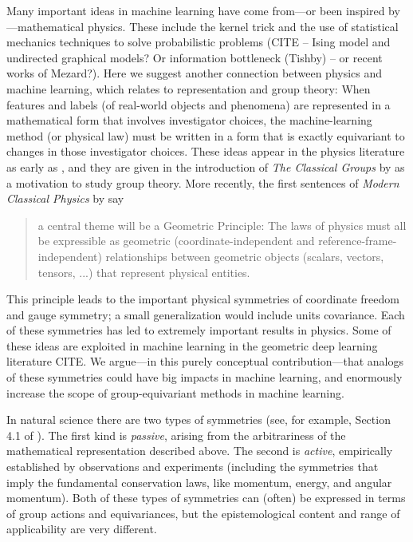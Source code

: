 \documentclass{article}
\theoremstyle{plain}
\theoremstyle{definition}
\theoremstyle{remark}
\begin{document}
Many important ideas in machine learning have come from---or been inspired by---mathematical physics.
These include the kernel trick \cite{CouHil53,SchSmo02} and the use of statistical mechanics techniques to solve probabilistic problems (CITE --  Ising model and undirected graphical models? Or information bottleneck (Tishby) -- or recent works of Mezard?).
Here we suggest another connection between physics and machine learning, which relates to representation and group theory:
When features and labels (of real-world objects and phenomena) are represented in a mathematical form that involves investigator choices, the machine-learning method (or physical law) must be written in a form that is exactly equivariant to changes in those investigator choices.
These ideas appear in the physics literature as early as \citet{gr}, and they are given in the introduction of \textit{The Classical Groups} by \citet{weyl} as a motivation to study group theory.
More recently, the first sentences of \textit{Modern Classical Physics} by \citet{mcp} say  
\begin{quote}
a central theme will be a Geometric Principle: 
The laws of physics must all
be expressible as geometric (coordinate-independent and reference-frame-independent)
relationships between geometric objects (scalars, vectors, tensors, ...) that represent
physical entities.
\end{quote}
This principle leads to the important physical symmetries of coordinate freedom and gauge symmetry; a small generalization would include units covariance.
Each of these symmetries has led to extremely important results in physics. Some of these ideas are exploited in machine learning in the geometric deep learning literature CITE. 
We argue---in this purely conceptual contribution---that analogs of these symmetries could have big impacts in machine learning, and enormously increase the scope of group-equivariant methods in machine learning.

In natural science there are two types of symmetries (see, for example, Section 4.1 of \citealt{rovelli2000loop}). 
The first kind is \emph{passive}, arising from the arbitrariness of the mathematical representation described above.
The second is \emph{active}, empirically established by observations and experiments (including the symmetries that imply the fundamental conservation laws, like momentum, energy, and angular momentum).
Both of these types of symmetries can (often) be expressed in terms of group actions and equivariances, but the epistemological content and range of applicability are very different. 
\end{document}
